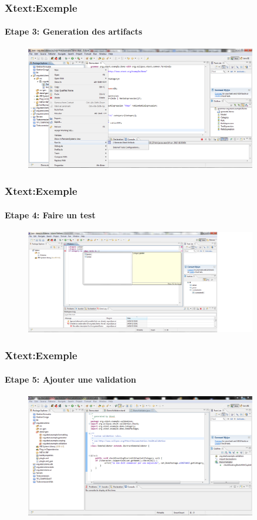 \documentclass{beamer}
\begin{document}
	\begin{frame}
	\frametitle{Xtext:Exemple}\framesubtitle{Etape 3: Generation des artifacts}
	\begin{figure}[h]
	\centering
			\includegraphics[width=0.90\textwidth]{3.PNG}
	\label{fig:3}
\end{figure}

\end{frame} 
	\begin{frame}
	\frametitle{Xtext:Exemple}\framesubtitle{Etape 4: Faire un test}
	\begin{figure}[h]
	\centering
			\includegraphics[width=0.90\textwidth]{4.PNG}
	\label{fig:4}
	\end{figure}

\end{frame} 	\begin{frame}
	\frametitle{Xtext:Exemple}\framesubtitle{Etape 5: Ajouter une validation}
	\begin{figure}[h]
	\centering
			\includegraphics[width=0.90\textwidth]{5.PNG}
	\label{fig:5}
\end{figure}

\end{frame} 
\end{document}
